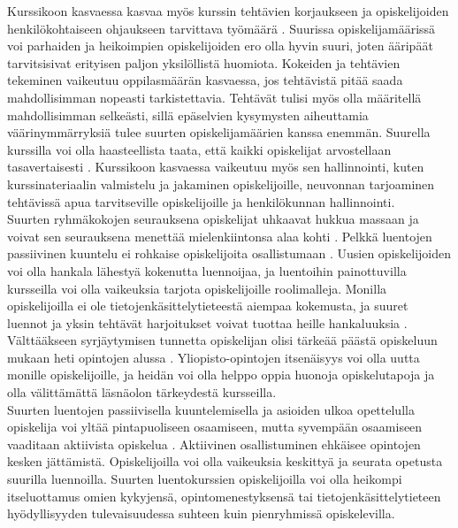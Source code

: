 \documentclass[finnish]{tktltiki2}
\theoremstyle{definition}
\theoremstyle{remark}
\begin{document}
Kurssikoon kasvaessa kasvaa myös kurssin tehtävien korjaukseen ja opiskelijoiden henkilökohtaiseen ohjaukseen tarvittava työmäärä \cite{Kay98}. Suurissa opiskelijamäärissä voi parhaiden ja heikoimpien opiskelijoiden ero olla hyvin suuri, joten ääripäät tarvitsisivat erityisen paljon yksilöllistä huomiota. Kokeiden ja tehtävien tekeminen vaikeutuu oppilasmäärän kasvaessa, jos tehtävistä pitää saada mahdollisimman nopeasti tarkistettavia. Tehtävät tulisi myös olla määritellä mahdollisimman selkeästi, sillä epäselvien kysymysten aiheuttamia väärinymmärryksiä tulee suurten opiskelijamäärien kanssa enemmän. Suurella kurssilla voi olla haasteellista taata, että kaikki opiskelijat arvostellaan tasavertaisesti \cite{Chamillard02}. Kurssikoon kasvaessa vaikeutuu myös sen hallinnointi, kuten kurssinateriaalin valmistelu ja jakaminen opiskelijoille, neuvonnan tarjoaminen tehtävissä apua tarvitseville opiskelijoille ja henkilökunnan hallinnointi.
\\
Suurten ryhmäkokojen seurauksena opiskelijat uhkaavat hukkua massaan ja voivat sen seurauksena menettää mielenkiintonsa alaa kohti \cite{Kay98}. Pelkkä luentojen passiivinen kuuntelu ei rohkaise opiskelijoita osallistumaan \cite{Kopp00}. Uusien opiskelijoiden voi olla hankala lähestyä kokenutta luennoijaa, ja luentoihin painottuvilla kursseilla voi olla vaikeuksia tarjota opiskelijoille roolimalleja. Monilla opiskelijoilla ei ole tietojenkäsittelytieteestä aiempaa kokemusta, ja suuret luennot ja yksin tehtävät harjoitukset voivat tuottaa heille hankaluuksia \cite{Murphy11}.
\\
Välttääkseen syrjäytymisen tunnetta opiskelijan olisi tärkeää päästä opiskeluun mukaan heti opintojen alussa \cite{Settle12}. Yliopisto-opintojen itsenäisyys voi olla uutta monille opiskelijoille, ja heidän voi olla helppo oppia huonoja opiskelutapoja ja olla välittämättä läsnäolon tärkeydestä kursseilla.
\\
Suurten luentojen passiivisella kuuntelemisella ja asioiden ulkoa opettelulla opiskelija voi yltää pintapuoliseen osaamiseen, mutta syvempään osaamiseen vaaditaan aktiivista opiskelua \cite{Boyer07}. Aktiivinen osallistuminen ehkäisee opintojen kesken jättämistä. Opiskelijoilla voi olla vaikeuksia keskittyä ja seurata opetusta suurilla luennoilla. Suurten luentokurssien opiskelijoilla voi olla heikompi itseluottamus omien kykyjensä, opintomenestyksensä tai tietojenkäsittelytieteen hyödyllisyyden tulevaisuudessa suhteen kuin pienryhmissä opiskelevilla.
\end{document}
